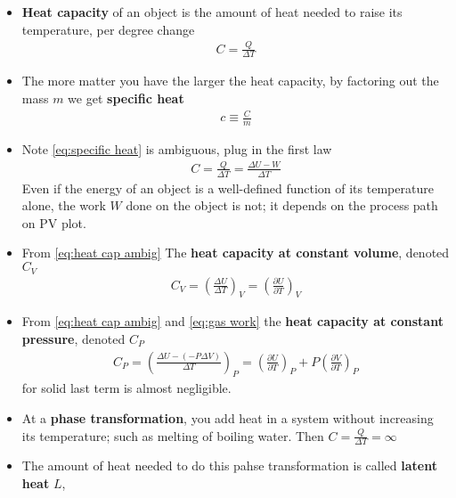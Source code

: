 \documentclass{book}
\begin{document}
\begin{itemize}
  \item \textbf{Heat capacity} of an object is the amount of heat needed to raise its temperature,
        per degree change
        \begin{align}
          \label{eq:heat capacity}
          C = \frac{Q}{\Delta{T}}
        \end{align}
  \item The more matter you have the larger the heat capacity, by factoring out the mass $m$
        we get \textbf{specific heat}
        \begin{align}
          \label{eq:specific heat}
          c \equiv \frac{C}{m}
        \end{align}
  \item Note \eqref{eq:specific heat} is ambiguous, plug in the first law
        \begin{align}
          \label{eq:heat cap ambig}
          C = \frac{Q}{\Delta{T}} = \frac{\Delta{U} - W}{\Delta{T}}
        \end{align}
        Even if the energy of an object is a well-defined function of its temperature alone,
        the work $W$ done on the object is not; it depends on the process path on PV plot.
  \item From \eqref{eq:heat cap ambig} The \textbf{heat capacity at constant volume}, denoted $C_{V}$
        \begin{align}
          \label{eq:heat cap v}
          C_{V} = {\left( \frac{\Delta{U}}{\Delta{T}} \right)}_{V} =
          \left( \frac{\partial U}{\partial T} \right)_{V}
        \end{align}
  \item From \eqref{eq:heat cap ambig} and \eqref{eq:gas work}
        the \textbf{heat capacity at constant pressure}, denoted $C_{P}$
        \begin{align}
          \label{eq:heat cap p}
          C_{P} = \left( \frac{\Delta{U} - (- P \Delta{V})}{\Delta{T}}  \right)_{P}
          = \left ( \frac{\partial U}{\partial T}  \right)_{P}
            + P \left ( \frac{\partial V}{\partial T}  \right)_{P}
        \end{align}
        for solid last term is almost negligible.
  \item At a \textbf{phase transformation}, you add heat in a system without increasing its temperature;
        such as melting of boiling water. Then $C = \frac{Q}{\Delta{T}} = \infty$
  \item The amount of heat needed to do this pahse transformation is called \textbf{latent heat} $L$,

\end{itemize}
\end{document}
